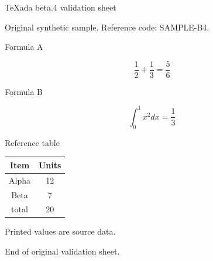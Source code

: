 \documentclass[UTF8,fontset=fandol]{ctexart}
\begin{document}
TeXada beta.4 validation sheet

Original synthetic sample. Reference code: SAMPLE-B4.

Formula A

$$\frac{1}{2} + \frac{1}{3} = \frac{5}{6}$$

Formula B

$$\int_{0}^{1} x^2 dx = \frac{1}{3}$$

Reference table

   \begin{tabular}{|c|c|}
      \hline
      Item & Units \\
      \hline
      Alpha & 12 \\
      Beta & 7 \\
      total & 20 \\
      \hline
     \end{tabular}

Printed values are source data.

End of original validation sheet.
\end{document}
